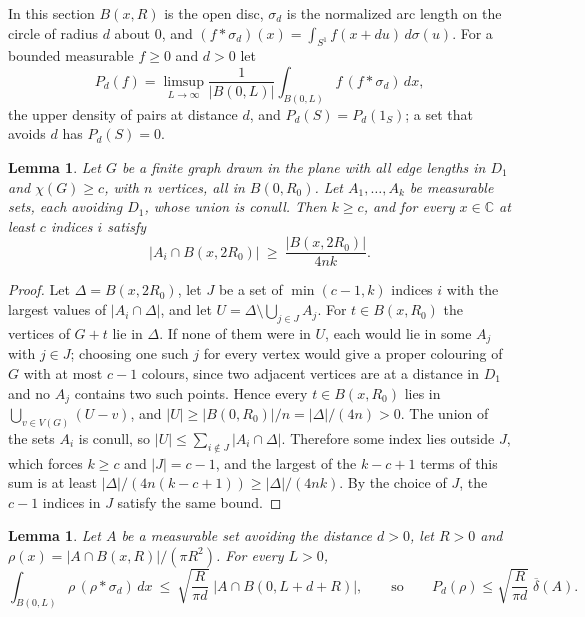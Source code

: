 \documentclass[11pt,a4paper]{amsart}
\newtheorem{lemma}[theorem]{Lemma}
\theoremstyle{definition}
\theoremstyle{remark}
\newcommand{\C}{\mathbb{C}}
\newcommand{\dens}{\overline{\delta}}
\begin{document}
In this section $B(x,R)$ is the open disc, $\sigma_d$ is the normalized arc length on the circle of radius $d$ about
$0$, and $(f*\sigma_d)(x)=\int_{S^1}f(x+du)\,d\sigma(u)$. For a bounded measurable $f\ge0$ and $d>0$ let
\[
P_d(f)=\limsup_{L\to\infty}\frac1{|B(0,L)|}\int_{B(0,L)}f\,(f*\sigma_d)\,dx,
\]
the upper density of pairs at distance $d$, and $P_d(S)=P_d(1_S)$; a set that avoids $d$ has $P_d(S)=0$.

\begin{lemma}\label{lem:window}
Let $G$ be a finite graph drawn in the plane with all edge lengths in $D_1$ and $\chi(G)\ge c$, with $n$ vertices,
all in $B(0,R_0)$. Let $A_1,\dots,A_k$ be measurable sets, each avoiding $D_1$, whose union is conull. Then $k\ge c$, and for every $x\in\C$ at least $c$ indices $i$ satisfy
\[
|A_i\cap B(x,2R_0)|\ \ge\ \frac{|B(x,2R_0)|}{4nk}.
\]
\end{lemma}

\begin{proof}
Let $\Delta=B(x,2R_0)$, let $J$ be a set of $\min(c-1,k)$ indices $i$ with the largest values of $|A_i\cap\Delta|$,
and let $U=\Delta\setminus\bigcup_{j\in J}A_j$. For $t\in B(x,R_0)$ the vertices of $G+t$ lie in $\Delta$. If none
of them were in $U$, each would lie in some $A_j$ with $j\in J$; choosing one such $j$ for every vertex would give a
proper colouring of $G$ with at most $c-1$ colours, since two adjacent vertices are at a distance in $D_1$ and no
$A_j$ contains two such points. Hence every
$t\in B(x,R_0)$ lies in $\bigcup_{v\in V(G)}(U-v)$, and $|U|\ge|B(0,R_0)|/n=|\Delta|/(4n)>0$. The union of the sets
$A_i$ is conull, so $|U|\le\sum_{i\notin J}|A_i\cap\Delta|$. Therefore some index lies outside $J$, which
forces $k\ge c$ and $|J|=c-1$, and the largest of the $k-c+1$ terms of this sum is at least
$|\Delta|/(4n(k-c+1))\ge|\Delta|/(4nk)$. By the choice of $J$, the $c-1$ indices in $J$ satisfy the same bound.
\end{proof}

\begin{lemma}\label{lem:smooth}
Let $A$ be a measurable set avoiding the distance $d>0$, let $R>0$ and $\rho(x)=|A\cap B(x,R)|/(\pi R^2)$. For every
$L>0$,
\[
\int_{B(0,L)}\rho\,(\rho*\sigma_d)\,dx\ \le\ \sqrt{\frac{R}{\pi d}}\;|A\cap B(0,L+d+R)|,
\qquad\text{so}\qquad P_d(\rho)\le\sqrt{\frac{R}{\pi d}}\;\dens(A).
\]
\end{lemma}
\end{document}
